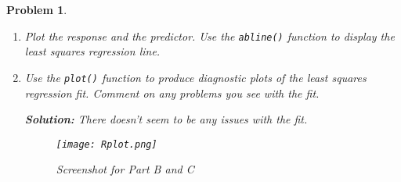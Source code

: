 \documentclass[12pt]{article}
\newtheorem{problem}{Problem} %
\theoremstyle{definition}
\newcommand{\solution}{\textcolor{PineGreen}{\textbf{Solution:}}\newline}
\begin{document}
\begin{problem}
\begin{enumerate}[label=(\alph*)]
    \item Plot the response and the predictor. Use the \texttt{abline()} function to display the least squares regression line.
    
    \item Use the \texttt{plot()} function to produce diagnostic plots of the least squares regression fit. Comment on any problems you see with the fit.

    \solution
    There doesn't seem to be any issues with the fit.

    \begin{figure}[h]
    \centering
    \texttt{[image: Rplot.png]} %
    \caption{Screenshot for Part B and C}
    \end{figure}

    

\end{enumerate}
\end{problem}
\end{document}
